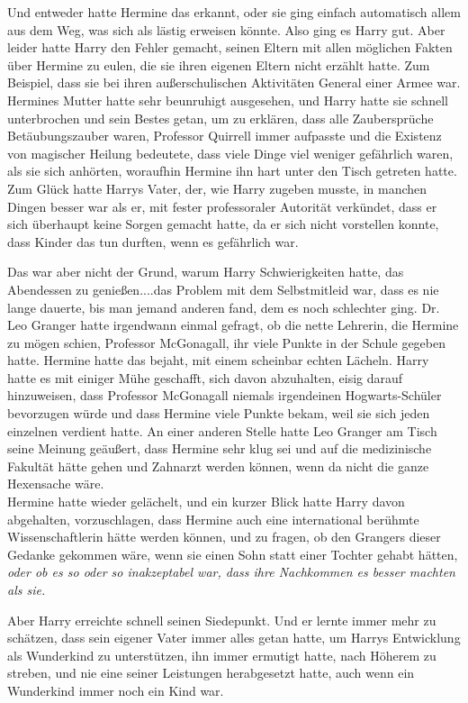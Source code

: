 {Und entweder hatte Hermine das erkannt, oder sie ging einfach automatisch allem aus dem Weg, was sich als lästig erweisen könnte. Also ging es Harry gut. Aber leider hatte Harry den Fehler gemacht, seinen Eltern mit allen möglichen Fakten über Hermine zu eulen, die sie ihren eigenen Eltern nicht erzählt hatte. Zum Beispiel, dass sie bei ihren außerschulischen Aktivitäten General einer Armee war. Hermines Mutter hatte sehr beunruhigt ausgesehen, und Harry hatte sie schnell unterbrochen und sein Bestes getan, um zu erklären, dass alle Zaubersprüche Betäubungszauber waren, Professor Quirrell immer aufpasste und die Existenz von magischer Heilung bedeutete, dass viele Dinge viel weniger gefährlich waren, als sie sich anhörten, woraufhin Hermine ihn hart unter den Tisch getreten hatte. Zum Glück hatte Harrys Vater, der, wie Harry zugeben musste, in manchen Dingen besser war als er, mit fester professoraler Autorität verkündet, dass er sich überhaupt keine Sorgen gemacht hatte, da er sich nicht vorstellen konnte, dass Kinder das tun durften, wenn es gefährlich war.

Das war aber nicht der Grund, warum Harry Schwierigkeiten hatte, das Abendessen zu genießen....das Problem mit dem Selbstmitleid war, dass es nie lange dauerte, bis man jemand anderen fand, dem es noch schlechter ging. Dr. Leo Granger hatte irgendwann einmal gefragt, ob die nette Lehrerin, die Hermine zu mögen schien, Professor McGonagall, ihr viele Punkte in der Schule gegeben hatte. Hermine hatte das bejaht, mit einem scheinbar echten Lächeln. Harry hatte es mit einiger Mühe geschafft, sich davon abzuhalten, eisig darauf hinzuweisen, dass Professor McGonagall niemals irgendeinen Hogwarts-Schüler bevorzugen würde und dass Hermine viele Punkte bekam, weil sie sich jeden einzelnen verdient hatte. An einer anderen Stelle hatte Leo Granger am Tisch seine Meinung geäußert, dass Hermine sehr klug sei und auf die medizinische Fakultät hätte gehen und Zahnarzt werden können, wenn da nicht die ganze Hexensache wäre.\\ Hermine hatte wieder gelächelt, und ein kurzer Blick hatte Harry davon abgehalten, vorzuschlagen, dass Hermine auch eine international berühmte Wissenschaftlerin hätte werden können, und zu fragen, ob den Grangers dieser Gedanke gekommen wäre, wenn sie einen Sohn statt einer Tochter gehabt hätten, \emph{oder ob es so oder so inakzeptabel war, dass ihre Nachkommen es besser machten als sie.}

Aber Harry erreichte schnell seinen Siedepunkt. Und er lernte immer mehr zu schätzen, dass sein eigener Vater immer alles getan hatte, um Harrys Entwicklung als Wunderkind zu unterstützen, ihn immer ermutigt hatte, nach Höherem zu streben, und nie eine seiner Leistungen herabgesetzt hatte, auch wenn ein Wunderkind immer noch ein Kind war.

}
